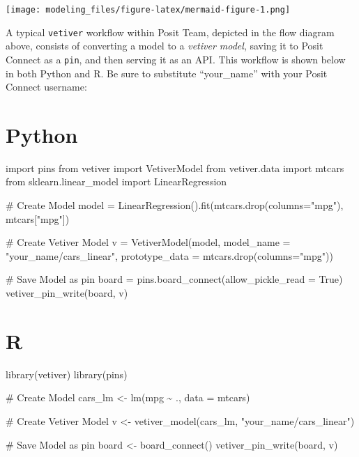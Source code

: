 \documentclass[
  letterpaper,
  DIV=11,
  numbers=noendperiod]{scrreprt}
\newenvironment{Shaded}{\begin{snugshade}}{\end{snugshade}}
\newcommand{\AttributeTok}[1]{\textcolor[rgb]{0.40,0.45,0.13}{#1}}
\newcommand{\CommentTok}[1]{\textcolor[rgb]{0.37,0.37,0.37}{#1}}
\newcommand{\FunctionTok}[1]{\textcolor[rgb]{0.28,0.35,0.67}{#1}}
\newcommand{\ImportTok}[1]{\textcolor[rgb]{0.00,0.46,0.62}{#1}}
\newcommand{\NormalTok}[1]{\textcolor[rgb]{0.00,0.23,0.31}{#1}}
\newcommand{\OperatorTok}[1]{\textcolor[rgb]{0.37,0.37,0.37}{#1}}
\newcommand{\OtherTok}[1]{\textcolor[rgb]{0.00,0.23,0.31}{#1}}
\newcommand{\SpecialCharTok}[1]{\textcolor[rgb]{0.37,0.37,0.37}{#1}}
\newcommand{\StringTok}[1]{\textcolor[rgb]{0.13,0.47,0.30}{#1}}
\newcommand{\VariableTok}[1]{\textcolor[rgb]{0.07,0.07,0.07}{#1}}
\begin{document}
\texttt{[image: modeling\_files/figure-latex/mermaid-figure-1.png]}

A typical \texttt{vetiver} workflow within Posit Team, depicted in the
flow diagram above, consists of converting a model to a \emph{vetiver
model}, saving it to Posit Connect as a \texttt{pin}, and then serving
it as an API. This workflow is shown below in both Python and R. Be sure
to substitute ``your\_name'' with your Posit Connect username:

\section{Python}

\begin{Shaded}
\begin{Highlighting}[]
\ImportTok{import}\NormalTok{ pins}
\ImportTok{from}\NormalTok{ vetiver }\ImportTok{import}\NormalTok{ VetiverModel}
\ImportTok{from}\NormalTok{ vetiver.data }\ImportTok{import}\NormalTok{ mtcars}
\ImportTok{from}\NormalTok{ sklearn.linear\_model }\ImportTok{import}\NormalTok{ LinearRegression}

\CommentTok{\# Create Model}
\NormalTok{model }\OperatorTok{=}\NormalTok{ LinearRegression().fit(mtcars.drop(columns}\OperatorTok{=}\StringTok{"mpg"}\NormalTok{), mtcars[}\StringTok{"mpg"}\NormalTok{])}

\CommentTok{\# Create Vetiver Model}
\NormalTok{v }\OperatorTok{=}\NormalTok{ VetiverModel(model, model\_name }\OperatorTok{=} \StringTok{"your\_name/cars\_linear"}\NormalTok{, }
\NormalTok{                 prototype\_data }\OperatorTok{=}\NormalTok{ mtcars.drop(columns}\OperatorTok{=}\StringTok{"mpg"}\NormalTok{))}

\CommentTok{\# Save Model as pin}
\NormalTok{board }\OperatorTok{=}\NormalTok{ pins.board\_connect(allow\_pickle\_read }\OperatorTok{=} \VariableTok{True}\NormalTok{)}
\NormalTok{vetiver\_pin\_write(board, v)}
\end{Highlighting}
\end{Shaded}

\section{R}

\begin{Shaded}
\begin{Highlighting}[]
\FunctionTok{library}\NormalTok{(vetiver)}
\FunctionTok{library}\NormalTok{(pins)}

\CommentTok{\# Create Model}
\NormalTok{cars\_lm }\OtherTok{\textless{}{-}} \FunctionTok{lm}\NormalTok{(mpg }\SpecialCharTok{\textasciitilde{}}\NormalTok{ ., }\AttributeTok{data =}\NormalTok{ mtcars)}

\CommentTok{\# Create Vetiver Model}
\NormalTok{v }\OtherTok{\textless{}{-}} \FunctionTok{vetiver\_model}\NormalTok{(cars\_lm, }\StringTok{"your\_name/cars\_linear"}\NormalTok{)}

\CommentTok{\# Save Model as pin}
\NormalTok{board }\OtherTok{\textless{}{-}} \FunctionTok{board\_connect}\NormalTok{()}
\FunctionTok{vetiver\_pin\_write}\NormalTok{(board, v)}
\end{Highlighting}
\end{Shaded}
\end{document}
